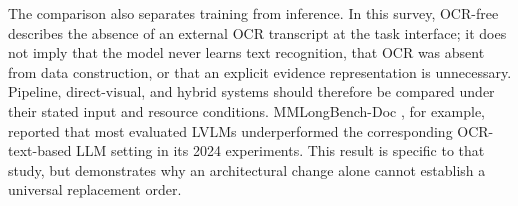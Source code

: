 The comparison also separates training from inference. In this survey, OCR-free describes the absence of an external OCR transcript at the task interface; it does not imply that the model never learns text recognition, that OCR was absent from data construction, or that an explicit evidence representation is unnecessary. Pipeline, direct-visual, and hybrid systems should therefore be compared under their stated input and resource conditions. MMLongBench-Doc \cite{mmlongbenchdoc2024}, for example, reported that most evaluated LVLMs underperformed the corresponding OCR-text-based LLM setting in its 2024 experiments. This result is specific to that study, but demonstrates why an architectural change alone cannot establish a universal replacement order.
